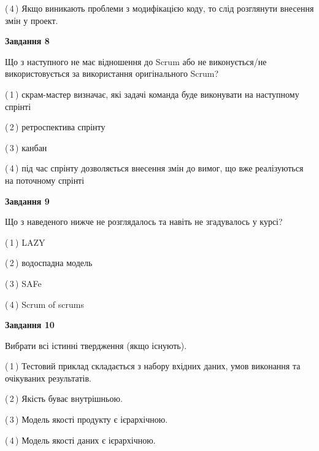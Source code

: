\documentclass[10pt, ukrainian]{article}
\begin{document}
{\begin {large}
(\,4\,) Якщо виникають проблеми з модифікацією коду, то слід розглянути внесення змін у проект. %


{\begin {center}\textbf{Завдання 8}\end {center}}\par
Що з наступного не має відношення до Scrum або не виконується/не використовується за використання оригінального Scrum?\par
\vspace{2mm}



(\,1\,) скрам-мастер визначає, які задачі команда буде виконувати на наступному спрінті%



(\,2\,) ретроспектива спрінту%



(\,3\,) канбан%



(\,4\,) під час спрінту дозволяється внесення змін до вимог, що вже реалізуються на поточному спрінті%


{\begin {center}\textbf{Завдання 9}\end {center}}\par
Що з наведеного нижче не розглядалось та навіть не згадувалось у курсі?\par
\vspace{2mm}



(\,1\,) LAZY%



(\,2\,) водоспадна модель%



(\,3\,) SAFe%



(\,4\,) Scrum of scrums%


{\begin {center}\textbf{Завдання 10}\end {center}}\par
Вибрати всі істинні твердження (якщо існують).\par
\vspace{2mm}



(\,1\,) Тестовий приклад складається з набору вхідних даних, умов виконання та очікуваних результатів.%



(\,2\,) Якість буває внутрішньою.%



(\,3\,) Модель якості продукту є ієрархічною.%



(\,4\,) Модель якості даних є ієрархічною.%



\end {large}}
\end{document}
